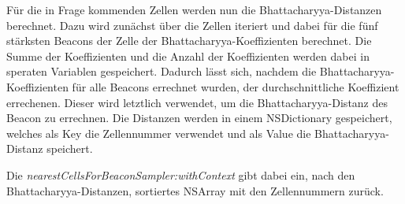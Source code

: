 Für die in Frage kommenden Zellen werden nun die Bhattacharyya-Distanzen berechnet. Dazu wird zunächst über die Zellen iteriert und dabei für die fünf stärksten Beacons der Zelle der Bhattacharyya-Koeffizienten berechnet. Die Summe der Koeffizienten und die Anzahl der Koeffizienten werden dabei in  speraten Variablen gespeichert. Dadurch lässt sich, nachdem die Bhattacharyya-Koeffizienten für alle Beacons errechnet wurden, der durchschnittliche Koeffizient errechenen. Dieser wird letztlich verwendet, um die Bhattacharyya-Distanz des Beacon zu errechnen. Die Distanzen werden in einem NSDictionary gespeichert, welches als Key die Zellennummer verwendet und als Value die Bhattacharyya-Distanz speichert.

Die \emph{nearestCellsForBeaconSampler:withContext} gibt dabei ein, nach den Bhattacharyya-Distanzen, sortiertes NSArray mit den Zellennummern zurück. 




